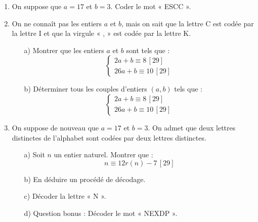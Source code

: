 {{\begin{enumerate}
    \item On suppose que \(a = 17\) et \(b = 3\). Coder le mot « ESCC ».
    \item On ne connaît pas les entiers \(a\) et \(b\), mais on sait que la lettre C est codée par la lettre I et que la virgule « , » est codée par la lettre K.
    \begin{itemize}
        \item[a)] Montrer que les entiers \(a\) et \(b\) sont tels que :
       $$
        \begin{cases}
        2a + b \equiv 8 \, [29] \\
       26a+b \equiv 10 \, [29]
        \end{cases}
        $$
        \item[b)] Déterminer tous les couples d’entiers \((a, b)\) tels que :
       $$
        \begin{cases}
        2a + b \equiv 8 \, [29] \\
        26a+b \equiv 10 \, [29]
        \end{cases}
       $$
    \end{itemize}
    \item On suppose de nouveau que \(a = 17\) et \(b = 3\). On admet que deux lettres distinctes de l’alphabet sont codées par deux lettres distinctes.
    \begin{itemize}
        \item[a)] Soit \(n\) un entier naturel. Montrer que :
    $$
        n \equiv 12r(n) -  7 \, [29]
       $$
        \item[b)] En déduire un procédé de décodage.
        \item[c)] Décoder la lettre « N ».
        \item[d)] Question bonus : Décoder le mot « NEXDP ».
    \end{itemize}
\end{enumerate}

}
}